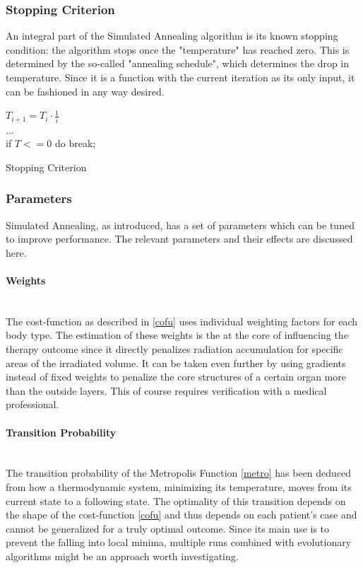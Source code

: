 \documentclass[12pt]{article}
\begin{document}
\subsubsection{Stopping Criterion}
\label{subsubsec: SAstopcrit}	
An integral part of the Simulated Annealing algorithm is its known stopping condition: the algorithm stops once the "temperature" has reached zero. This is determined by the so-called "annealing schedule", which determines the drop in temperature. Since it is a function with the current iteration as its only input, it can be fashioned in any way desired. \\

\begin{algorithm}[H]
	$T_{i+1} = T_{i} \cdot \frac{1}{i}$~\\
	$...$ ~\\
	if $T<=0$ do break;
	 
\caption{Stopping Criterion}
\end{algorithm}  

\newpage
\subsubsection{Parameters}
Simulated Annealing, as introduced, has a set of parameters which can be tuned to improve performance. The relevant parameters and their effects are discussed here.

\paragraph{Weights}~\\
The cost-function as described in \ref{cofu} uses individual weighting factors for each body type.  The estimation of these weights is the at the core of influencing the therapy outcome since it directly penalizes radiation accumulation for specific areas of the irradiated volume. It can be taken even further by using gradients instead of fixed weights to penalize the core structures of a certain organ more than the outside layers. This of course requires verification with a medical professional.

\paragraph{Transition Probability} ~\\ 
The transition probability of the Metropolis Function \ref{metro} has been deduced from how a thermodynamic system, minimizing its temperature, moves from its current state to a following state. The optimality of this transition depends on the shape of the cost-function \ref{cofu} and thus depends on each patient's case and cannot be generalized for a truly optimal outcome. Since its main use is to prevent the falling into local minima, multiple runs combined with evolutionary algorithms might be an approach worth investigating.
\end{document}
